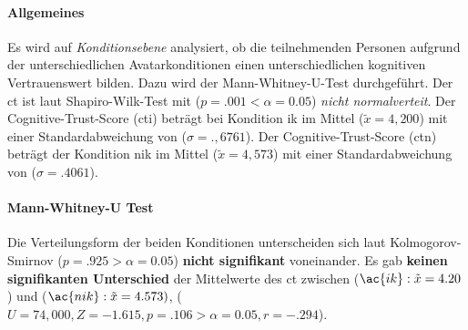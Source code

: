 \documentclass[a4paper,11pt]{article}%
\renewcommand{\\}{\vspace*{0.5\baselineskip} \newline}
\begin{document}
\paragraph{Allgemeines}
Es wird auf \textit{Konditionsebene} analysiert, ob die teilnehmenden Personen aufgrund der unterschiedlichen Avatarkonditionen einen unterschiedlichen kognitiven Vertrauenswert bilden. Dazu wird der Mann-Whitney-U-Test durchgeführt. \\
Der \ac{ct} ist laut Shapiro-Wilk-Test mit ($p = .001 < \alpha = 0.05$) \textit{nicht normalverteit}.
Der Cognitive-Trust-Score (\ac{cti}) beträgt bei Kondition \ac{ik} im Mittel ($\tilde x = 4,200$) mit einer Standardabweichung von ($\sigma = .,6761$).\newline 
Der Cognitive-Trust-Score (\ac{ctn}) beträgt der Kondition \ac{nik} im Mittel ($\tilde x = 4,573$) mit einer Standardabweichung von ($\sigma = .4061$).

\paragraph{Mann-Whitney-U Test}
Die Verteilungsform der beiden Konditionen unterscheiden sich laut Kolmogorov-Smirnov ($p = .925 > \alpha = 0.05$) \textbf{nicht signifikant} voneinander. Es gab \textbf{keinen signifikanten Unterschied} der Mittelwerte des \ac{ct} zwischen ($\ac{ik} : \tilde x = 4.20$) und ($\ac{nik} : \tilde x = 4.573)$, ($U = 74,000 , Z = -1.615, p = .106 > \alpha = 0.05, r =-.294$).
\end{document}
